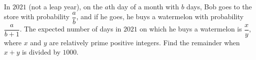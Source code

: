 In $2021$ (not a leap year), on the $a$th day of a month with $b$ days, Bob goes to the store with probability $\dfrac ab$, and if he goes, he buys a watermelon with probability $\dfrac{a}{b+1}$. The expected number of days in $2021$ on which he buys a watermelon is $\dfrac xy$, where $x$ and $y$ are relatively prime positive integers. Find the remainder when $x+y$ is divided by $1000$.
